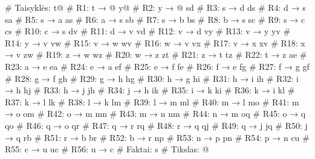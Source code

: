 \begin{pythonaienv}[fc]
# Taisyklės:
t@             # R1: t → @
y@             # R2: y → @
sd             # R3: s → d
ds             # R4: d → s
sa             # R5: s → a
as             # R6: a → s
sb             # R7: s → b
bs             # R8: b → s
sc             # R9: s → c
cs             # R10: c → s
dv             # R11: d → v
vd             # R12: v → d
vy             # R13: v → y
yv             # R14: y → v
vw             # R15: v → w
wv             # R16: w → v
vx             # R17: v → x
xv             # R18: x → v
zw             # R19: z → w
wz             # R20: w → z
zt             # R21: z → t
tz             # R22: t → z
ae             # R23: a → e
ea             # R24: e → a
ef             # R25: e → f
fe             # R26: f → e
fg             # R27: f → g
gf             # R28: g → f
gh             # R29: g → h
hg             # R30: h → g
hi             # R31: h → i
ih             # R32: i → h
hj             # R33: h → j
jh             # R34: j → h
ik             # R35: i → k
ki             # R36: k → i
kl             # R37: k → l
lk             # R38: l → k
lm             # R39: l → m
ml             # R40: m → l
mo             # R41: m → o
om             # R42: o → m
mn             # R43: m → n
nm             # R44: n → m
oq             # R45: o → q
qo             # R46: q → o
qr             # R47: q → r
rq             # R48: r → q
qj             # R49: q → j
jq             # R50: j → q
rb             # R51: r → b
br             # R52: b → r
np             # R53: n → p
pn             # R54: p → n
cu             # R55: c → u
uc             # R56: u → c
# Faktai:
s
# Tikslas:
@
\end{pythonaienv}
